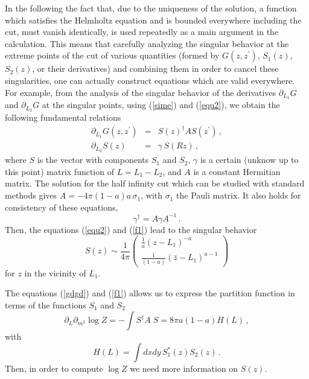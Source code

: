 \documentclass[11pt]{article}
\begin{document}
In the following the fact that, due to the uniqueness of the solution, a function which satisfies the Helmholtz equation and is bounded everywhere including the cut, must vanish identically, is used repeatedly as a main argument in the calculation. This means that carefully analyzing the singular behavior at the extreme points of the cut of various quantities (formed by $G(z,z^\prime)$, $S_1(z)$, $S_2(z)$, or their derivatives) and combining them in order to cancel these singularities, one can actually construct equations which are valid everywhere.   
For example, from the analysis of the singular behavior of the derivatives $\partial_{L_1}G$ and $\partial_{L_2}G$ at the singular points, using (\ref{sime}) and (\ref{equ2}), we obtain the following fundamental relations
\begin{eqnarray}
\partial _{L_{1}}G(z,z^{\prime})&=&S(z)^{\dagger
}AS(z^{\prime})  \label{f1}\,,\\
\partial _{L_{2}}S(z)&=&\gamma \,S(Rz) \,, \label{a}
\end{eqnarray}
where $S$ is the vector with components $S_1$ and $S_2$, $\gamma $ is a certain (unknow up to this point) matrix function of $L=L_{1}-L_{2}$, and $A$ is a constant Hermitian matrix. The solution for the half infinity cut which can be studied with standard methods gives $A=-4\pi (1-a )a \,\sigma _{1}$, with $\sigma_1$  the Pauli matrix.
It also holds for consistency of these equations, 
\begin{equation}
\gamma ^{\dagger }=A\gamma A^{-1}\,. \label{129}
\end{equation}
Then, the equations (\ref{equ2}) and (\ref{f1}) lead to the singular behavior 
\begin{equation}
S(z)\sim \frac{1}{4\pi }\left(
\begin{array}{l}
\frac{1}{a }(z-L_{1})^{-a } \\
\frac{1}{(1-a )}(\bar{z}-L_{1})^{a -1}
\end{array}
\right)  \label{wr}
\end{equation}
for $z$ in the vicinity of $L_{1}$. 

The equations (\ref{gdgd}) and (\ref{f1}) allows us to express the partition function in terms of the functions $S_1$ and $S_2$
\begin{equation}
\partial _{L}\partial _{m^{2}}\log Z=-\int S^{\dagger
}A\;S=8\pi a \left( 1-a \right)H(L)\,,\label{partfunc}
\end{equation}
with
\begin{equation}
H(L) =\int dxdy\,S_{1}^{*}(z)S_{2}(z) \,. \label{hh}
\end{equation}
Then, in order to compute $\log Z$ we need more information on $S(z)$.
\end{document}
